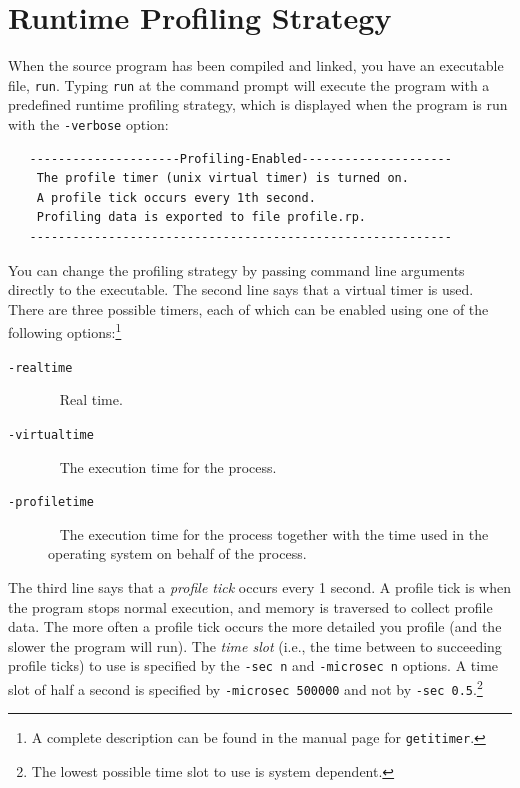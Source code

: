 \documentclass[12pt]{book}
\begin{document}
\section{Runtime Profiling Strategy}
When the source program has been compiled and linked, you have an
executable file, \texttt{run}. Typing \texttt{run} at the command prompt will
execute the program with a predefined 
%
runtime profiling strategy, which is displayed when the program is
run with the {\tt -verbose} option:
\begin{verbatim}
   ---------------------Profiling-Enabled---------------------
    The profile timer (unix virtual timer) is turned on.
    A profile tick occurs every 1th second.
    Profiling data is exported to file profile.rp.
   -----------------------------------------------------------
\end{verbatim}
You can change the 
%
profiling strategy by passing command line arguments directly to the
executable.  The second line says that a virtual timer is used. There
are three possible timers, each of which can be enabled using one of
the following options:\footnote{A complete description can be
    found in the manual page for \texttt{getitimer}.}
\begin{description}
\item[{\tt -realtime}]~
  Real time.
\item[{\tt -virtualtime}]~ 
  The execution time for the process.
\item[{\tt -profiletime}]~
  The execution time for the process together with the time used in
  the operating system on behalf of the process.
\end{description}

The third line says that a 
%
{\em profile tick\/} occurs every 1 second.  A profile tick is when
the program stops normal execution, and memory is traversed to collect
profile data. The more often a profile tick occurs the more detailed
you profile (and the slower the program will run). The
%
{\em time slot\/} (i.e., the time between to succeeding profile ticks) to use
is specified by the 
%
\texttt{-sec n} and 
%
\texttt{-microsec n} options. A time slot of half a second is
specified by \texttt{-microsec 500000} and not by \texttt{-sec
  0.5}.\footnote{The lowest possible time slot to use is system
  dependent. 
}
\end{document}
